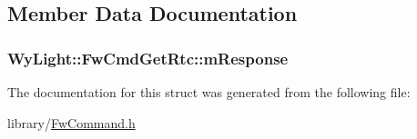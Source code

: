 \subsection{Member Data Documentation}
\hypertarget{struct_wy_light_1_1_fw_cmd_get_rtc_a50e0bf16f83ee888c2bd3e1fa5d6b8ff}{
\subsubsection[{m\-Response}]{ Wy\-Light\-::\-Fw\-Cmd\-Get\-Rtc\-::m\-Response}}\label{struct_wy_light_1_1_fw_cmd_get_rtc_a50e0bf16f83ee888c2bd3e1fa5d6b8ff}


The documentation for this struct was generated from the following file\-:\begin{DoxyCompactItemize}
\item 
library/\hyperlink{_fw_command_8h}{Fw\-Command.\-h}\end{DoxyCompactItemize}
